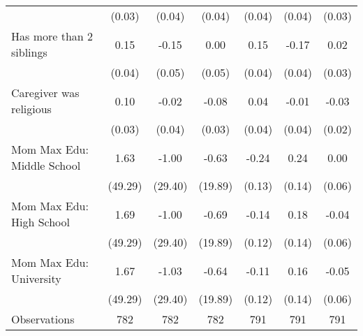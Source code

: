 {\begin{tabular}{l*{6}{c}}
                    &      (0.03)         &      (0.04)         &      (0.04)         &      (0.04)         &      (0.04)         &      (0.03)         \\
\addlinespace
Has more than 2 siblings&        0.15\sym{***}&       -0.15\sym{**} &        0.00         &        0.15\sym{***}&       -0.17\sym{***}&        0.02         \\
                    &      (0.04)         &      (0.05)         &      (0.05)         &      (0.04)         &      (0.04)         &      (0.03)         \\
\addlinespace
Caregiver was religious&        0.10\sym{**} &       -0.02         &       -0.08\sym{*}  &        0.04         &       -0.01         &       -0.03         \\
                    &      (0.03)         &      (0.04)         &      (0.03)         &      (0.04)         &      (0.04)         &      (0.02)         \\
\addlinespace
Mom Max Edu: Middle School&        1.63         &       -1.00         &       -0.63         &       -0.24         &        0.24         &        0.00         \\
                    &     (49.29)         &     (29.40)         &     (19.89)         &      (0.13)         &      (0.14)         &      (0.06)         \\
\addlinespace
Mom Max Edu: High School&        1.69         &       -1.00         &       -0.69         &       -0.14         &        0.18         &       -0.04         \\
                    &     (49.29)         &     (29.40)         &     (19.89)         &      (0.12)         &      (0.14)         &      (0.06)         \\
\addlinespace
Mom Max Edu: University&        1.67         &       -1.03         &       -0.64         &       -0.11         &        0.16         &       -0.05         \\
                    &     (49.29)         &     (29.40)         &     (19.89)         &      (0.12)         &      (0.14)         &      (0.06)         \\
\midrule
Observations        &         782         &         782         &         782         &         791         &         791         &         791         \\
\bottomrule
\end{tabular}
}
